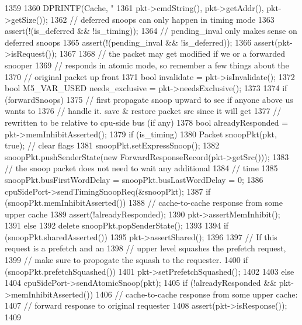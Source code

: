 \begin{DoxyCode}
1359 {
1360     DPRINTF(Cache, "%
1361             pkt->cmdString(), pkt->getAddr(), pkt->getSize());
1362     // deferred snoops can only happen in timing mode
1363     assert(!(is_deferred && !is_timing));
1364     // pending_inval only makes sense on deferred snoops
1365     assert(!(pending_inval && !is_deferred));
1366     assert(pkt->isRequest());
1367 
1368     // the packet may get modified if we or a forwarded snooper
1369     // responds in atomic mode, so remember a few things about the
1370     // original packet up front
1371     bool invalidate = pkt->isInvalidate();
1372     bool M5_VAR_USED needs_exclusive = pkt->needsExclusive();
1373 
1374     if (forwardSnoops) {
1375         // first propagate snoop upward to see if anyone above us wants to
1376         // handle it.  save & restore packet src since it will get
1377         // rewritten to be relative to cpu-side bus (if any)
1378         bool alreadyResponded = pkt->memInhibitAsserted();
1379         if (is_timing) {
1380             Packet snoopPkt(pkt, true);  // clear flags
1381             snoopPkt.setExpressSnoop();
1382             snoopPkt.pushSenderState(new ForwardResponseRecord(pkt->getSrc()));
1383             // the snoop packet does not need to wait any additional
1384             // time
1385             snoopPkt.busFirstWordDelay = snoopPkt.busLastWordDelay = 0;
1386             cpuSidePort->sendTimingSnoopReq(&snoopPkt);
1387             if (snoopPkt.memInhibitAsserted()) {
1388                 // cache-to-cache response from some upper cache
1389                 assert(!alreadyResponded);
1390                 pkt->assertMemInhibit();
1391             } else {
1392                 delete snoopPkt.popSenderState();
1393             }
1394             if (snoopPkt.sharedAsserted()) {
1395                 pkt->assertShared();
1396             }
1397             // If this request is a prefetch and an
1398             // upper level squashes the prefetch request,
1399             // make sure to propogate the squash to the requester.
1400             if (snoopPkt.prefetchSquashed()) {
1401                 pkt->setPrefetchSquashed();
1402             }
1403         } else {
1404             cpuSidePort->sendAtomicSnoop(pkt);
1405             if (!alreadyResponded && pkt->memInhibitAsserted()) {
1406                 // cache-to-cache response from some upper cache:
1407                 // forward response to original requester
1408                 assert(pkt->isResponse());
1409             }
}}}
\end{DoxyCode}
